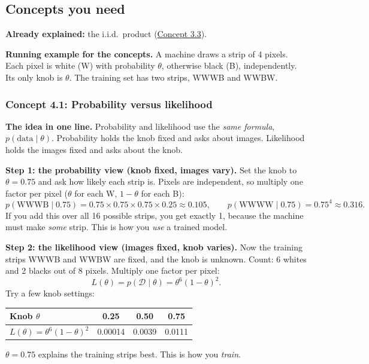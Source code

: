 \documentclass[12pt,a4paper]{article}
\begin{document}
\subsection{Concepts you need}

\textbf{Already explained:} the i.i.d.\ product (\hyperref[c3-3]{Concept 3.3}).

\textbf{Running example for the concepts.} A machine draws a strip of 4 pixels. Each pixel is white (W) with probability $\theta$, otherwise black (B), independently. Its only knob is $\theta$. The training set has two strips, WWWB and WWBW.

\subsubsection{Concept 4.1: Probability versus likelihood}\label{c4-1}

\textbf{The idea in one line.} Probability and likelihood use the \emph{same formula}, $p(\text{data}\mid\theta)$. Probability holds the knob fixed and asks about images. Likelihood holds the images fixed and asks about the knob.

\textbf{Step 1: the probability view (knob fixed, images vary).} Set the knob to $\theta=0.75$ and ask how likely each strip is. Pixels are independent, so multiply one factor per pixel ($\theta$ for each W, $1-\theta$ for each B):
\[
p(\text{WWWB}\mid0.75)=0.75\times0.75\times0.75\times0.25\approx0.105,\qquad p(\text{WWWW}\mid0.75)=0.75^4\approx0.316 .
\]
If you add this over all 16 possible strips, you get exactly 1, because the machine must make \emph{some} strip. This is how you \emph{use} a trained model.

\textbf{Step 2: the likelihood view (images fixed, knob varies).} Now the training strips WWWB and WWBW are fixed, and the knob is unknown. Count: 6 whites and 2 blacks out of 8 pixels. Multiply one factor per pixel:
\[
L(\theta)=p(\mathcal{D}\mid\theta)=\theta^6(1-\theta)^2 .
\]
Try a few knob settings:
\begin{center}
\begin{tabular}{@{}lccc@{}}
\toprule
Knob $\theta$ & 0.25 & 0.50 & 0.75 \\
\midrule
$L(\theta)=\theta^6(1-\theta)^2$ & 0.00014 & 0.0039 & 0.0111 \\
\bottomrule
\end{tabular}
\end{center}
$\theta=0.75$ explains the training strips best. This is how you \emph{train}.
\end{document}
